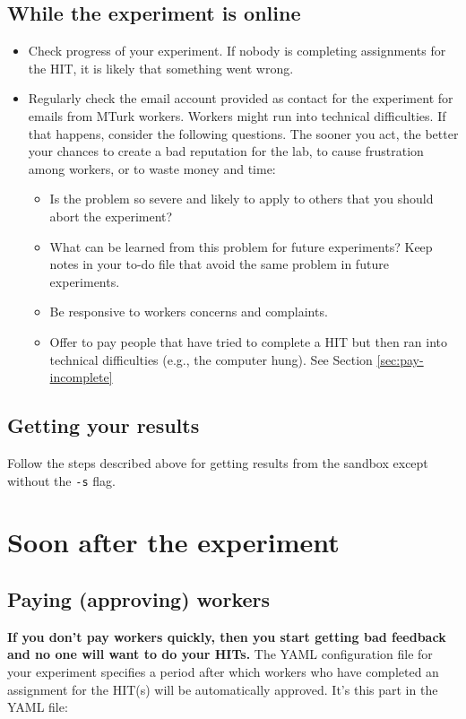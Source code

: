 \documentclass{article}
\begin{document}
\subsection{While the experiment is online}
\begin{tcolorbox}[colback=gray!5,colframe=blue!40!black,title=Monitoring while the experiment is in progress]
\begin{itemize}
    \item Check progress of your experiment. If nobody is completing assignments for the HIT, it is likely that something went wrong. %
    \item Regularly check the email account provided as contact for the experiment for emails from MTurk workers. Workers might run into technical difficulties. If that happens, consider the following questions. The sooner you act, the better your chances to create a bad reputation for the lab, to cause frustration among workers, or to waste money and time:
    \begin{itemize}
    	\item Is the problem so severe and likely to apply to others that you should abort the experiment? 
	\item What can be learned from this problem for future experiments? Keep notes in your to-do file that avoid the same problem in future experiments. 
	\item Be responsive to workers concerns and complaints. 
	\item Offer to pay people that have tried to complete a HIT but then ran into technical difficulties (e.g., the computer hung). See Section \ref{sec:pay-incomplete}
   \end{itemize}
\end{itemize}
\end{tcolorbox}
   

\subsection{Getting your results}
Follow the steps described above for getting results from the sandbox except without the \texttt{-s} flag.


\section{Soon after the experiment}

\subsection{Paying (approving) workers}
\textbf{If you don’t pay workers quickly, then you start getting bad feedback and no one will want to do your HITs. }
The YAML configuration file for your experiment specifies a period after which workers who have completed an assignment for the HIT(s) will be automatically approved. It's this part in the YAML file:
\end{document}
